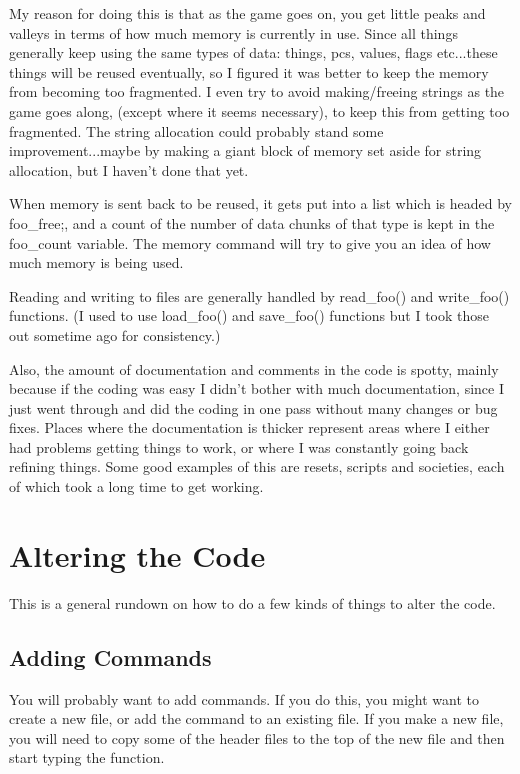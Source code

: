 My reason for doing this is that as the game goes on, you get little
peaks and valleys in terms of how much memory is currently in
use. Since all things generally keep using the same types of data:
things, pcs, values, flags etc...these things will be reused
eventually, so I figured it was better to keep the memory from
becoming too fragmented. I even try to avoid making/freeing strings as
the game goes along, (except where it seems necessary), to keep this
from getting too fragmented. The string allocation could probably
stand some improvement...maybe by making a giant block of memory set
aside for string allocation, but I haven't done that yet.

When memory is sent back to be reused, it gets put into a list which
is headed by foo\_free;, and a count of the number of data chunks of
that type is kept in the foo\_count variable. The memory command will
try to give you an idea of how much memory is being used.

Reading and writing to files are generally handled by read\_foo() and
write\_foo() functions. (I used to use load\_foo() and save\_foo() functions
but I took those out sometime ago for consistency.)

Also, the amount of documentation and comments in the code is spotty,
mainly because if the coding was easy I didn't bother with much
documentation, since I just went through and did the coding in one
pass without many changes or bug fixes. Places where the documentation
is thicker represent areas where I either had problems getting things
to work, or where I was constantly going back refining things. Some
good examples of this are resets, scripts and societies, each of which took a
long time to get working.

\section{Altering the Code}

This is a general rundown on how to do a few kinds of things
to alter the code.

\subsection{Adding Commands}

You will probably want to add commands. If you do this, you
might want to create a new file, or add the command to an existing
file. If you make a new file, you will need to copy some of the
header files to the top of the new file and then start typing
the function.

